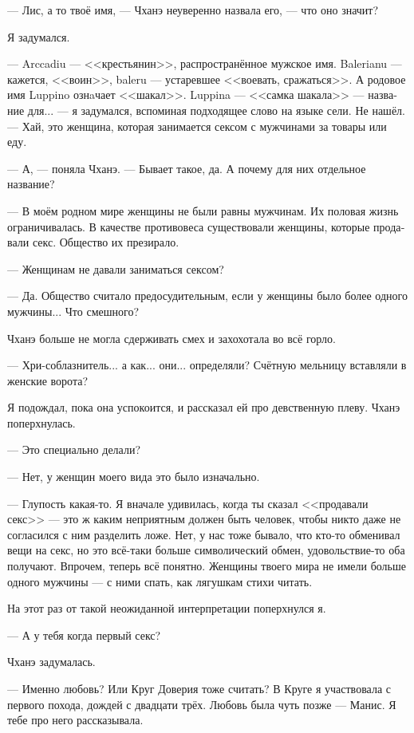 \documentclass[a4paper,12pt,fleqn]{book}\usepackage{polyglossia}\setdefaultlanguage[babelshorthands=true]{russian}\setotherlanguage{english}\defaultfontfeatures{Ligatures=TeX,Mapping=tex-text}\usepackage{xcolor}\newcommand{\ml}[3]{#2}
\begin{document}
{--- Лис, а то твоё имя, --- Чханэ неуверенно назвала его, --- что оно значит?

Я задумался.

--- Arccadiu --- <<крестьянин>>, распространённое мужское имя.
Balerianu --- кажется, <<воин>>, baleru --- устаревшее <<воевать, сражаться>>.
А родовое имя Luppino ознaчает <<шакал>>.
Luppina --- <<самка шакала>> --- название для... --- я задумался, вспоминая подходящее слово на языке сели.
Не нашёл.
--- Хай, это женщина, которая занимается сексом с мужчинами за товары или еду.

--- А, --- поняла Чханэ.
--- Бывает такое, да.
А почему для них отдельное название?

--- В моём родном мире женщины не были равны мужчинам.
Их половая жизнь ограничивалась.
В качестве противовеса существовали женщины, которые продавали секс.
Общество их презирало.

--- Женщинам не давали заниматься сексом?

--- Да.
Общество считало предосудительным, если у женщины было более одного мужчины...
Что смешного?

Чханэ больше не могла сдерживать смех и захохотала во всё горло.

--- Хри-соблазнитель... а как... они... определяли?
Счётную мельницу вставляли в женские ворота?

Я подождал, пока она успокоится, и рассказал ей про девственную плеву.
Чханэ поперхнулась.

--- Это специально делали?

--- Нет, у женщин моего вида это было изначально.

--- Глупость какая-то.
Я вначале удивилась, когда ты сказал <<продавали секс>> --- это ж каким неприятным должен быть человек, чтобы никто даже не согласился с ним разделить ложе.
Нет, у нас тоже бывало, что кто-то обменивал вещи на секс, но это всё-таки больше символический обмен, удовольствие-то оба получают.
Впрочем, теперь всё понятно.
Женщины твоего мира не имели больше одного мужчины --- с ними спать, как лягушкам стихи читать.

На этот раз от такой неожиданной интерпретации поперхнулся я.

--- А у тебя когда первый секс?

Чханэ задумалась.

--- Именно любовь?
Или Круг Доверия тоже считать?
В Круге я участвовала с первого похода, дождей с двадцати трёх.
Любовь была чуть позже --- Манис.
Я тебе про него рассказывала.

}
\end{document}
